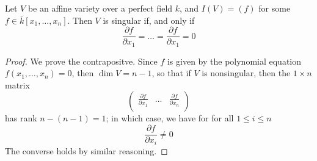 \begin{lemma}\label{1.1.6}
    Let $V$ be an affine variety over a perfect field $k$, and $I(V)=(f)$ for
    some $f \in \bar{k}[x_1, \dots, x_n]$. Then $V$ is singular if, and only if
    \begin{equation*}
        \frac{\partial{f}}{\partial{x_1}}= \dots
        =\frac{\partial{f}}{\partial{x_1}}=0
    \end{equation*}
\end{lemma}
\begin{proof}
    We prove the contrapositve. Since $f$ is given by the polynomial equation
    $f(x_1, \dots ,x_n)=0$, then $\dim{V}=n-1$, so that if $V$ is nonsingular,
    then the  $1 \times n$ matrix
    \begin{equation*}
        \begin{pmatrix}
        \frac{\partial{f}}{\partial{x_1}} & \dots & \frac{\partial{f}}{\partial{x_n}} \\
        \end{pmatrix}
    \end{equation*}
    has rank $n-(n-1)=1$; in which case, we have for for all $1 \leq i \leq n$
    \begin{equation*}
        \frac{\partial{f}}{\partial{x_i}} \neq 0
    \end{equation*}
    The converse holds by similar reasoning.
\end{proof}

